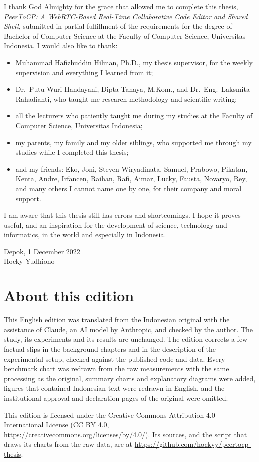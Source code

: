 I thank God Almighty for the grace that allowed me to complete this thesis, \emph{PeerToCP: A WebRTC-Based Real-Time Collaborative Code Editor and Shared Shell}, submitted in partial fulfillment of the requirements for the degree of Bachelor of Computer Science at the Faculty of Computer Science, Universitas Indonesia. I would also like to thank:

\begin{itemize}
  \item Muhammad Hafizhuddin Hilman, Ph.D., my thesis supervisor, for the weekly supervision and everything I learned from it;
  \item Dr.\ Putu Wuri Handayani, Dipta Tanaya, M.Kom., and Dr.\ Eng.\ Laksmita Rahadianti, who taught me research methodology and scientific writing;
  \item all the lecturers who patiently taught me during my studies at the Faculty of Computer Science, Universitas Indonesia;
  \item my parents, my family and my older siblings, who supported me through my studies while I completed this thesis;
  \item and my friends: Eko, Joni, Steven Wiryadinata, Samuel, Prabowo, Pikatan, Kenta, Andre, Irfancen, Raihan, Rafi, Aimar, Lucky, Fausta, Novaryo, Rey, and many others I cannot name one by one, for their company and moral support.
\end{itemize}

I am aware that this thesis still has errors and shortcomings. I hope it proves useful, and an inspiration for the development of science, technology and informatics, in the world and especially in Indonesia.

\begin{flushright}
Depok, 1 December 2022\\[0.5em]
Hocky Yudhiono
\end{flushright}

\section*{About this edition}

This English edition was translated from the Indonesian original with the assistance of Claude, an AI model by Anthropic, and checked by the author. The study, its experiments and its results are unchanged. The edition corrects a few factual slips in the background chapters and in the description of the experimental setup, checked against the published code and data. Every benchmark chart was redrawn from the raw measurements with the same processing as the original, summary charts and explanatory diagrams were added, figures that contained Indonesian text were redrawn in English, and the institutional approval and declaration pages of the original were omitted.

This edition is licensed under the Creative Commons Attribution 4.0 International License (CC BY 4.0, \url{https://creativecommons.org/licenses/by/4.0/}). Its sources, and the script that draws its charts from the raw data, are at \url{https://github.com/hockyy/peertocp-thesis}.
